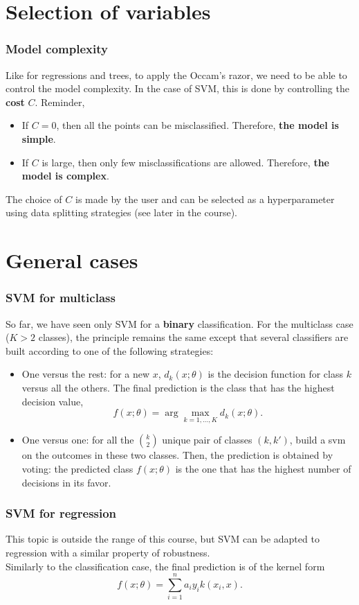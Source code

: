 \section{Selection of variables}
\begin{frame}
\frametitle{Model complexity}
Like for regressions and trees, to apply the Occam's razor, we need to be able to control the model complexity. In the case of SVM, this is done by controlling the {\bf cost} $C$. Reminder,
\begin{itemize}
\item If $C=0$, then all the points can be misclassified. Therefore, {\bf the model is simple}.
\item If $C$ is large, then only few misclassifications are allowed. Therefore, {\bf the model is complex}.
\end{itemize}
The choice of $C$ is made by the user and can be selected as a hyperparameter using data splitting strategies (see later in the course).
\end{frame}
\section{General cases}
\begin{frame}
\frametitle{SVM for multiclass}
So far, we have seen only SVM for a {\bf binary} classification. For the multiclass case ($K>2$ classes), the principle remains the same except that several classifiers are built according to one of the following strategies:
\begin{itemize}
\item One versus the rest: for a new $x$, $d_k(x;\theta)$ is the decision function for class $k$ versus all the others.  The final prediction is the class that has the highest decision value,
$$
f(x;\theta) = \arg\max_{k=1,\ldots,K} d_k(x;\theta).
$$
\item One versus one: for all the $\binom{k}{2}$ unique pair of classes $(k,k')$, build a svm on the outcomes in these two classes. Then, the prediction is obtained by voting: the predicted class $f(x;\theta)$ is the one that has the highest number of decisions in its favor.
\end{itemize}
\end{frame}
\begin{frame}
\frametitle{SVM for regression}
This topic is outside the range of this course, but SVM can be adapted to regression with a similar property of robustness.\\
\vspace{0.3cm}
Similarly to the classification case, the final prediction is of the kernel form
$$
f(x;\theta) = \sum_{i=1}^n a_i y_i k(x_i,x).
$$ 
\end{frame}


